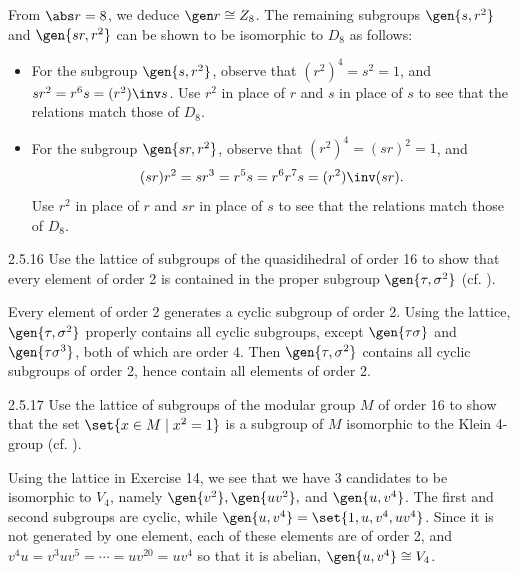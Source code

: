 \begin{sol}
    From $\abs r = 8$, we deduce $\gen r \cong Z_8$.
	The remaining subgroups $\gen{s, r^2}$ and $\gen{sr, r^2}$ can be shown to be isomorphic to $D_8$ as follows:
    \begin{itemize}
        \item For the subgroup $\gen{s, r^2}$, observe that $(r^2)^4 = s^2 = 1$, and $sr^2 = r^6s = (r^2)\inv s$.
	Use $r^2$ in place of $r$ and $s$ in place of $s$ to see that the relations match those of $D_8$.
        \item For the subgroup $\gen{sr, r^2}$, observe that $(r^2)^4 = (sr)^2 = 1$, and \[
 	(sr)r^2 = sr^3 = r^5s = r^6r^7s = (r^2)\inv(sr).
 \]
        Use $r^2$ in place of $r$ and $sr$ in place of $s$ to see that the relations match those of $D_8$. \qedhere
    \end{itemize}
\end{sol}

\begin{exercise}{2.5.16}
    Use the lattice of subgroups of the quasidihedral of order 16 to show that every element of order 2 is contained in the proper subgroup $\gen{\tau, \sigma^2}$ (cf. ).
\end{exercise}

\begin{sol}
    Every element of order 2 generates a cyclic subgroup of order 2.
	Using the lattice, $\gen{\tau, \sigma^2}$ properly contains all cyclic subgroups, except $\gen{\tau\sigma}$ and $\gen{\tau\sigma^3}$, both of which are order 4.
	Then $\gen{\tau, \sigma^2}$ contains all cyclic subgroups of order 2, hence contain all elements of order 2.
\end{sol}

\begin{exercise}{2.5.17}
    Use the lattice of subgroups of the modular group $M$ of order 16 to show that the set $\set{x \in M \mid x^2 = 1}$ is a subgroup of $M$ isomorphic to the Klein 4-group (cf. ).
\end{exercise}

\begin{sol}
    Using the lattice in Exercise 14, we see that we have 3 candidates to be isomorphic to $V_4$, namely $\gen{v^2}, \gen{uv^2},$ and $\gen{u, v^4}$.
	The first and second subgroups are cyclic, while $\gen{u, v^4} = \set{1, u, v^4, uv^4}$.
	Since it is not generated by one element, each of these elements are of order 2, and $v^4u = v^3uv^5 = \cdots = uv^{20} = uv^4$ so that it is abelian, $\gen{u, v^4} \cong V_4$.
\end{sol}

